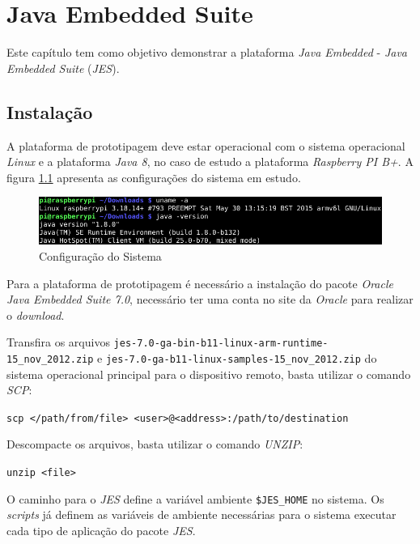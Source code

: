 %

\chapter{Java Embedded Suite}

Este capítulo tem como objetivo demonstrar a plataforma \textit{Java Embedded}
- \textit{Java Embedded Suite} (\textit{JES}).

\section{Instalação}

A plataforma de prototipagem deve estar operacional com o sistema operacional
\textit{Linux} e a plataforma \textit{Java 8}, no caso de estudo a plataforma
\textit{Raspberry PI B+}. A figura \ref{fig:jes/configuracao} apresenta as
configurações do sistema em estudo.

\begin{figure}[H]
    \centering
    \includegraphics[width=0.7\linewidth]{figuras/java/configuracao}
    \caption{Configuração do Sistema}
    \label{fig:jes/configuracao}
\end{figure}

Para a plataforma de prototipagem é necessário a instalação do pacote
\textit{Oracle Java Embedded Suite 7.0}, necessário ter uma conta no site da
\textit{Oracle} para realizar o \textit{download}.

Transfira os arquivos \newline
\verb|jes-7.0-ga-bin-b11-linux-arm-runtime-15_nov_2012.zip|
 e \newline
\verb|jes-7.0-ga-b11-linux-samples-15_nov_2012.zip|
 do sistema operacional principal para o dispositivo remoto, basta
utilizar o comando \textit{SCP}:

\verb|scp </path/from/file> <user>@<address>:/path/to/destination|

Descompacte os arquivos, basta utilizar o comando \textit{UNZIP}:

\verb|unzip <file>|

O caminho para o \textit{JES} define a variável ambiente
\verb|$JES_HOME| no sistema. Os \textit{scripts} já definem as variáveis de
ambiente necessárias para o sistema executar cada tipo de aplicação do pacote
\textit{JES}.

